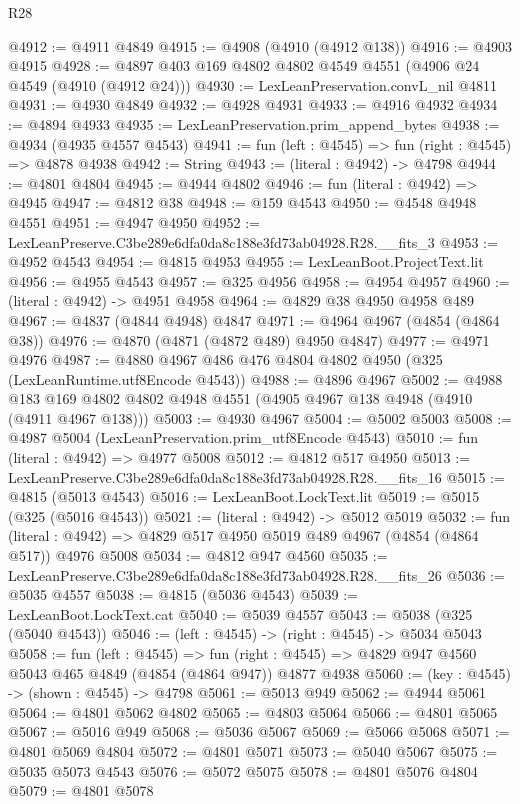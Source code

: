\begin{lexlean}{R28}
\begin{coremodule}
@4912 := @4911 @4849
@4915 := @4908 (@4910 (@4912 @138))
@4916 := @4903 @4915
@4928 := @4897 @403 @169 @4802 @4802 @4549 @4551 (@4906 @24 @4549 (@4910 (@4912 @24)))
@4930 := LexLeanPreservation.convL_nil @4811
@4931 := @4930 @4849
@4932 := @4928 @4931
@4933 := @4916 @4932
@4934 := @4894 @4933
@4935 := LexLeanPreservation.prim_append_bytes
@4938 := @4934 (@4935 @4557 @4543)
@4941 := fun (left : @4545) => fun (right : @4545) => @4878 @4938
@4942 := String
@4943 := (literal : @4942) -> @4798
@4944 := @4801 @4804
@4945 := @4944 @4802
@4946 := fun (literal : @4942) => @4945
@4947 := @4812 @38
@4948 := @159 @4543
@4950 := @4548 @4948 @4551
@4951 := @4947 @4950
@4952 := LexLeanPreserve.C3be289e6dfa0da8c188e3fd73ab04928.R28.__fits_3
@4953 := @4952 @4543
@4954 := @4815 @4953
@4955 := LexLeanBoot.ProjectText.lit
@4956 := @4955 @4543
@4957 := @325 @4956
@4958 := @4954 @4957
@4960 := (literal : @4942) -> @4951 @4958
@4964 := @4829 @38 @4950 @4958 @489
@4967 := @4837 (@4844 @4948) @4847
@4971 := @4964 @4967 (@4854 (@4864 @38))
@4976 := @4870 (@4871 (@4872 @489) @4950 @4847)
@4977 := @4971 @4976
@4987 := @4880 @4967 @486 @476 @4804 @4802 @4950 (@325 (LexLeanRuntime.utf8Encode @4543))
@4988 := @4896 @4967
@5002 := @4988 @183 @169 @4802 @4802 @4948 @4551 (@4905 @4967 @138 @4948 (@4910 (@4911 @4967 @138)))
@5003 := @4930 @4967
@5004 := @5002 @5003
@5008 := @4987 @5004 (LexLeanPreservation.prim_utf8Encode @4543)
@5010 := fun (literal : @4942) => @4977 @5008
@5012 := @4812 @517 @4950
@5013 := LexLeanPreserve.C3be289e6dfa0da8c188e3fd73ab04928.R28.__fits_16
@5015 := @4815 (@5013 @4543)
@5016 := LexLeanBoot.LockText.lit
@5019 := @5015 (@325 (@5016 @4543))
@5021 := (literal : @4942) -> @5012 @5019
@5032 := fun (literal : @4942) => @4829 @517 @4950 @5019 @489 @4967 (@4854 (@4864 @517)) @4976 @5008
@5034 := @4812 @947 @4560
@5035 := LexLeanPreserve.C3be289e6dfa0da8c188e3fd73ab04928.R28.__fits_26
@5036 := @5035 @4557
@5038 := @4815 (@5036 @4543)
@5039 := LexLeanBoot.LockText.cat
@5040 := @5039 @4557
@5043 := @5038 (@325 (@5040 @4543))
@5046 := (left : @4545) -> (right : @4545) -> @5034 @5043
@5058 := fun (left : @4545) =>
  fun (right : @4545) => @4829 @947 @4560 @5043 @465 @4849 (@4854 (@4864 @947)) @4877 @4938
@5060 := (key : @4545) -> (shown : @4545) -> @4798
@5061 := @5013 @949
@5062 := @4944 @5061
@5064 := @4801 @5062 @4802
@5065 := @4803 @5064
@5066 := @4801 @5065
@5067 := @5016 @949
@5068 := @5036 @5067
@5069 := @5066 @5068
@5071 := @4801 @5069 @4804
@5072 := @4801 @5071
@5073 := @5040 @5067
@5075 := @5035 @5073 @4543
@5076 := @5072 @5075
@5078 := @4801 @5076 @4804
@5079 := @4801 @5078

\end{coremodule}
\end{lexlean}

